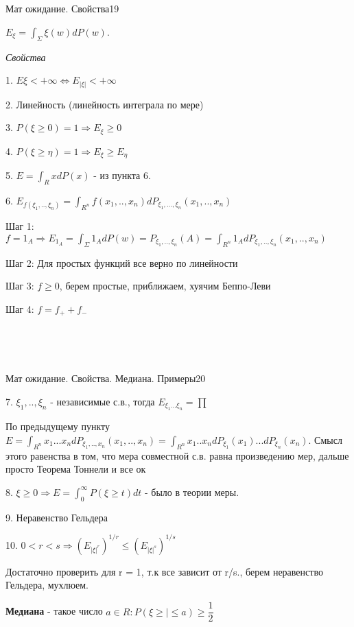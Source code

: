 \documentclass{article}
\begin{document}
~\

~\

\begin{question}{Мат ожидание. Свойства}{19}

$E_\xi = \int_\Sigma{\xi(w) dP(w)}$. 

\textit{Свойства}

1. $E\xi < + \infty \Leftrightarrow E_{|\xi|} < + \infty$

2. Линейность (линейность интеграла по мере)

3. $P(\xi \geq 0) = 1 \Rightarrow E_\xi \geq 0$

4. $P(\xi \geq \eta) = 1 \Rightarrow E_\xi \geq E_\eta$

5. $E = \int_RxdP(x)$ - из пункта 6.

6. $E_{f(\xi_1, .., \xi_n)} = \int_{R^n}{f(x_1, .., x_n) dP_{\xi_1, ..., \xi_n}(x_1, .., x_n)}$

Шаг 1: $f = 1_A \Rightarrow E_{1_A} = \int_\Sigma{1_AdP(w)} = P_{\xi_1, .., \xi_n}(A) = \int_{R^n}{1_A dP_{\xi_1, .., \xi_n}(x_1, .., x_n)}$

Шаг 2: Для простых функций все верно по линейности

Шаг 3: $f \geq 0$, берем простые, приближаем, хуячим Беппо-Леви

Шаг 4: $f = f_+ + f_-$

\end{question}

~\

~\

\begin{question}{Мат ожидание. Свойства. Медиана. Примеры}{20}

7. $\xi_1, .., \xi_n$ - независимые с.в., тогда $E_{\xi_1 ... \xi_n} = \prod$

По предыдущему пункту $E = \int_{R^n}{x_1...x_ndP_{\xi_1, .., x_n}(x_1, .., x_n)} = \int_{R^n}{x_1 .. x_n dP_{\xi_1}(x_1)...dP_{\xi_n}(x_n)}$. Смысл этого равенства в том, что мера совместной с.в. равна произведению мер, дальше просто Теорема Тоннели и все ок

8. $\xi \geq 0 \Rightarrow E = \int_0^\infty{P(\xi \geq t) dt}$ - было в теории меры.

9. Неравенство Гельдера

10. $0 < r < s \Rightarrow (E_{|\xi|^r})^{1/r} \leq (E_{|\xi|^s})^{1/s}$

Достаточно проверить для r = 1, т.к все зависит от r/s., берем неравенство Гельдера, мухлюем.

\textbf{Медиана} - такое число $a \in R : P(\xi \geq | \leq a) \geq \dfrac{1}{2}$

\end{question}
\end{document}
